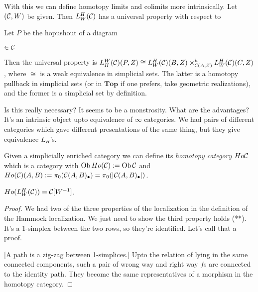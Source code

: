 \documentclass[class=report, crop=false,a4paper,twoside]{standalone}
\begin{document}
With this we can define homotopy limits and colimits more intrinsically. Let $(\mathcal{C},W)$ be given. Then $L_W^H(\mathcal{C})$ has a universal property with respect to 

\begin{example}
	Let $P$ be the hopushout of a diagram
	\begin{center}
		$\in \mathcal{C}$
	\end{center}

	Then the universal property is $L_H^W(\mathcal{C})(P,Z) \cong L_W^H(\mathcal{C})(B,Z) \times^h_{\mathcal{C}(A,Z)} L_W^H(\mathcal{C})(C,Z)$, where $\cong$ is a weak equivalence in simplicial sets. The latter is a homotopy pullback in simplicial sets (or in $\mathbf{Top}$ if one prefers, take geometric realizations), and the former is a simplicial set by definition.
\end{example}

Is this really necessary? It seems to be a monstrosity. What are the advantages? It's an intrinsic object upto equivalence of $\infty$ categories. We had pairs of different categories which gave different presentations of the same thing, but they give equivalence $L_H$'s.

\begin{definition}
	Given a simplicially enriched category we can define its \emph{homotopy category} $Ho\mathcal{C}$ which is a category with $\operatorname{Ob}Ho(\mathcal{C}) := \operatorname{Ob}\mathcal{C}$ and $Ho(\mathcal{C})(A,B) := \pi_0(\mathcal{C}(A,B)_\bullet) = \pi_0(|\mathcal{C}(A,B)_\bullet|)$.
\end{definition}

\begin{proposition}
	$Ho(L_W^H(\mathcal{C})) = \mathcal{C}[W^{-1}]$.
\end{proposition}

\begin{proof}
	We had two of the three properties of the localization in the definition of the Hammock localization. We just need to show the third property holds (**). It's a 1-simplex between the two rows, so they're identified. Let's call that a proof.

	[A path is a zig-zag between 1-simplices.] Upto the relation of lying in the same connected components, such a pair of wrong way and right way $f$s are connected to the identity path. They become the same representatives of a morphism in the homotopy category.
\end{proof}
\end{document}
